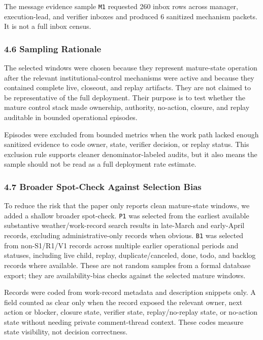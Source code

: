 \documentclass[
]{article}
\begin{document}
The message evidence sample \texttt{M1} requested 260 inbox rows across manager, execution-lead, and verifier inboxes and produced 6 sanitized mechanism packets. It is not a full inbox census.

\subsubsection{4.6 Sampling Rationale}\label{sampling-rationale}

The selected windows were chosen because they represent mature-state operation after the relevant institutional-control mechanisms were active and because they contained complete live, closeout, and replay artifacts. They are not claimed to be representative of the full deployment. Their purpose is to test whether the mature control stack made ownership, authority, no-action, closure, and replay auditable in bounded operational episodes.

Episodes were excluded from bounded metrics when the work path lacked enough sanitized evidence to code owner, state, verifier decision, or replay status. This exclusion rule supports cleaner denominator-labeled audits, but it also means the sample should not be read as a full deployment rate estimate.

\subsubsection{4.7 Broader Spot-Check Against Selection Bias}\label{broader-spot-check-against-selection-bias}

To reduce the risk that the paper only reports clean mature-state windows, we added a shallow broader spot-check. \texttt{P1} was selected from the earliest available substantive weather/work-record search results in late-March and early-April records, excluding administrative-only records when obvious. \texttt{B1} was selected from non-S1/R1/V1 records across multiple earlier operational periods and statuses, including live child, replay, duplicate/canceled, done, todo, and backlog records where available. These are not random samples from a formal database export; they are availability-bias checks against the selected mature windows.

Records were coded from work-record metadata and description snippets only. A field counted as clear only when the record exposed the relevant owner, next action or blocker, closure state, verifier state, replay/no-replay state, or no-action state without needing private comment-thread context. These codes measure state visibility, not decision correctness.
\end{document}
